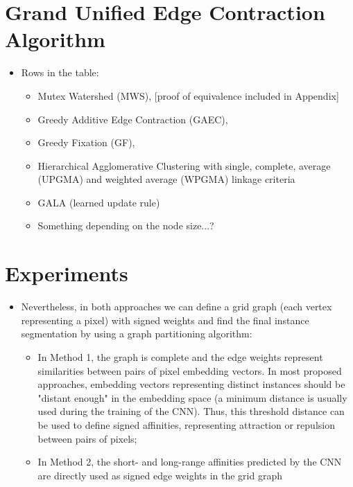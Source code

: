 \documentclass[10pt,twocolumn,letterpaper]{article}
\begin{document}
\section{Grand Unified Edge Contraction Algorithm}
\begin{itemize}
\item Rows in the table:
\begin{itemize}
\item Mutex Watershed (MWS), [proof of equivalence included in Appendix]
\item Greedy Additive Edge Contraction (GAEC), 
\item Greedy Fixation (GF), 
\item Hierarchical Agglomerative Clustering with single, complete, average (UPGMA) and weighted average (WPGMA) linkage criteria
\item GALA (learned update rule)
\item Something depending on the node size...?
\end{itemize}
\end{itemize}


\section{Experiments}
\begin{itemize}
\item Nevertheless, in both approaches we can define a grid graph (each vertex representing a pixel) with signed weights and find the final instance segmentation by using a graph partitioning algorithm:
\begin{itemize}
\item In Method 1, the graph is complete and the edge weights represent similarities between pairs of pixel embedding vectors. In most proposed approaches, embedding vectors representing distinct instances should be "distant enough" in the embedding space (a minimum distance is usually used during the training of the CNN). Thus, this threshold distance can be used to define signed affinities, representing attraction or repulsion between pairs of pixels;
\item  In Method 2, the short- and long-range affinities predicted by the CNN are directly used as signed edge weights in the grid graph
\end{itemize}
\end{itemize}
\end{document}
